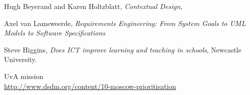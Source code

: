 \begin{thebibliography}{9}
	
	Hugh Beyerand and Karen Holtzblatt,
	\emph{Contextual Design},
	
	Axel van Lamsweerde,
	\emph{Requirements Engineering: From System Goals to UML Models to Software Specifications}
	
	Steve Higgins,
	\emph{Does ICT improve learning and teaching in schools},
	Newcastle University.
	
	UvA mission \\
	\url{http://www.dsdm.org/content/10-moscow-prioritisation}
	
\end{thebibliography}


\appendix



